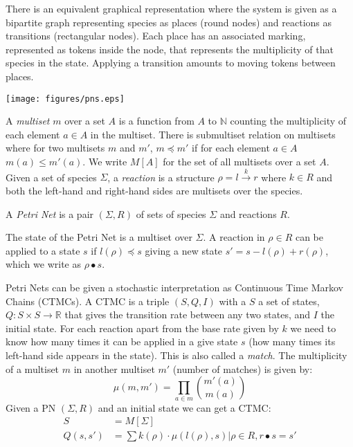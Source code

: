 There is an equivalent graphical representation where the system is given as a
bipartite graph representing species as places (round nodes) and reactions as
transitions (rectangular nodes). Each place has an associated marking,
represented as tokens inside the node, that represents the multiplicity of that
species in the state. Applying a transition amounts to moving tokens between
places.

\begin{center}
    \texttt{[image: figures/pns.eps]}
\end{center}

A \emph{multiset} $m$ over a set $A$ is a function from $A$ to $\mathbb{N}$ counting
the multiplicity of each element $a \in A$ in the multiset. There is submultiset
relation on multisets where for two multisets $m$ and $m'$, $m \preceq m'$ if for each
element $a \in A$ $m(a) \leq m'(a)$. We write $M[A]$ for the set of all multisets
over a set $A$. Given a set of species $\Sigma$, a \emph{reaction} is a structure $\rho
= l \xrightarrow{k} r$ where $k \in R$ and both the left-hand and right-hand
sides are multisets over the species. 

\begin{definition}
A \emph{Petri Net} is a pair $(\Sigma, R)$ of sets of species $\Sigma$ and reactions $R$.
\end{definition}

The state of the Petri Net is a multiset over $\Sigma$. A reaction in $\rho \in R$ can be
applied to a state $s$ if $l(\rho) \preceq s$ giving a new state $s' = s -
l(\rho) + r(\rho)$, which we write as $\rho \bullet s$.

Petri Nets can be given a stochastic interpretation as Continuous Time Markov
Chains (CTMCs). A CTMC is a triple $(S, Q, I)$ with a $S$ a set of states,
$Q: S \times S \rightarrow \mathbb{R}$ that gives the transition rate between
any two states, and $I$ the initial state. For each reaction apart from the base
rate given by $k$ we need to know how many times it can be applied in a give
state $s$ (\ie how many times its left-hand side appears in the state). This is
also called a \emph{match}. The multiplicity of a multiset $m$ in another
multiset $m'$ (number of matches) is given by:
$$
\mu(m, m') = \prod_{a \in m}  \binom{m'(a)}{m(a)}
$$
Given a PN $(\Sigma, R)$ and an initial state we can get a CTMC:
\begin{align*}
  S & = M[\Sigma] \\
  Q(s, s') &= \sum {k(\rho) \cdot \mu(l(\rho), s) | \rho \in R, r \bullet s = s'}
\end{align*}

